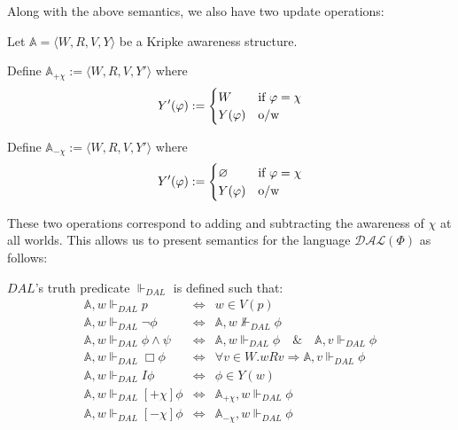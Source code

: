 Along with the above semantics, we also have two update operations:
\begin{definition}
Let $\mathbb{A} = \langle W, R, V, Y\rangle$ be a Kripke awareness
structure.

Define $\mathbb{A}_{+\chi} := \langle W, R, V, Y'\rangle$ where
\[ Y'(\phi) := \begin{cases} W & \textup{if $\phi = \chi$} \\
Y(\phi) & \textup{o/w} \end{cases} \]

Define $\mathbb{A}_{-\chi} := \langle W, R, V, Y'\rangle$ where
\[ Y'(\phi) := \begin{cases} \varnothing & \textup{if $\phi = \chi$} \\
Y(\phi) & \textup{o/w} \end{cases} \]
\end{definition}

These two operations correspond to adding and subtracting the awareness of
$\chi$ at all worlds.
This allows us to present semantics for the
language $\mathcal{DAL}(\Phi)$ as follows:

\begin{definition}
$DAL$'s truth predicate $\Vdash_{DAL}$ is defined such that:
\begin{eqnarray}
  \mathbb{A}, w \Vdash_{DAL} p & \Longleftrightarrow & w \in V (p)
  \nonumber\\
  \mathbb{A}, w \Vdash_{DAL} \neg \phi & \Longleftrightarrow &
  \mathbb{A}, w \nVdash_{DAL} \phi \nonumber\\
  \mathbb{A}, w \Vdash_{DAL} \phi \wedge \psi & \Longleftrightarrow &
  \mathbb{A}, w \Vdash_{DAL} \phi \hspace{1em} \& \hspace{1em}
  \mathbb{A}, v \Vdash_{DAL} \phi \nonumber\\
  \mathbb{A}, w \Vdash_{DAL} \Box \phi & \Longleftrightarrow & \forall
  v \in W.w R v \Longrightarrow \mathbb{A}, v \Vdash_{DAL} \phi
  \nonumber\\
  \mathbb{A}, w \Vdash_{DAL} I \phi & \Longleftrightarrow & \phi \in Y
  (w) \nonumber\\
  \mathbb{A}, w \Vdash_{DAL} [+ \chi] \phi & \Longleftrightarrow &
  \mathbb{A}_{+ \chi}, w \Vdash_{DAL} \phi \nonumber\\
  \mathbb{A}, w \Vdash_{DAL} [- \chi] \phi & \Longleftrightarrow &
  \mathbb{A}_{- \chi}, w \Vdash_{DAL} \phi \nonumber
\end{eqnarray}
\end{definition}

